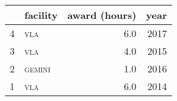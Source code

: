 \begin{tabular}{rlrr}

\toprule & \multicolumn{1}{c}{facility} & \multicolumn{1}{c}{award (hours)}  & \multicolumn{1}{c}{year} \\ 
\midrule

4  &  \textsc{\MakeTextLowercase{VLA}}  &  6.0  &  2017\\

3  &  \textsc{\MakeTextLowercase{VLA}}  &  4.0  &  2015\\

2  &  \textsc{\MakeTextLowercase{Gemini}}  &  1.0  &  2016\\

1  &  \textsc{\MakeTextLowercase{VLA}}  &  6.0  &  2014\\

\bottomrule\end{tabular}
